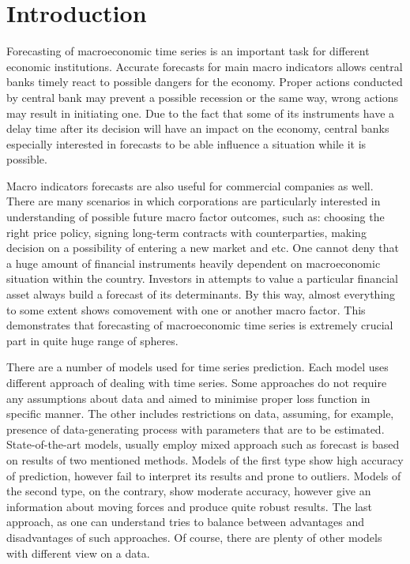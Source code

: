 \documentclass[a4paper, 14pt]{article}
\begin{document}
\section*{Introduction}

Forecasting of macroeconomic time series is an important task for different economic institutions. Accurate forecasts for main macro indicators allows central banks timely react to possible dangers for the economy. Proper actions conducted by central bank may prevent a possible recession or the same way, wrong actions may result in initiating one. Due to the fact that some of its instruments have a delay time after its decision will have an impact on the economy, central banks especially interested in forecasts to be able influence a situation while it is possible. 

Macro indicators forecasts are also useful for commercial companies as well. There are many scenarios in which corporations are particularly interested in understanding of possible future macro factor outcomes, such as: choosing the right price policy, signing long-term contracts with counterparties, making decision on a possibility of entering a new market and etc. One cannot deny that a huge amount of financial instruments heavily dependent on macroeconomic situation within the country. Investors in attempts to value a particular financial asset always build a forecast of its determinants. By this way, almost everything to some extent shows comovement with one or another macro factor. This demonstrates that forecasting of macroeconomic time series is extremely crucial part in quite huge range of spheres.  

There are a number of models used for time series prediction. Each model uses different approach of dealing with time series. Some approaches do not require any assumptions about data and aimed to minimise proper loss function in specific manner. The other includes restrictions on data, assuming, for example, presence of data-generating process with parameters that are to be estimated. State-of-the-art models, usually employ mixed approach such as forecast is based on results of two mentioned methods. Models of the first type show high accuracy of prediction, however fail to interpret its results and prone to outliers. Models of the second type, on the contrary, show moderate accuracy, however give an information about moving forces and produce quite robust results. The last approach, as one can understand tries to balance between advantages and disadvantages of such approaches. Of course, there are plenty of other models with different view on a data. 
\end{document}
